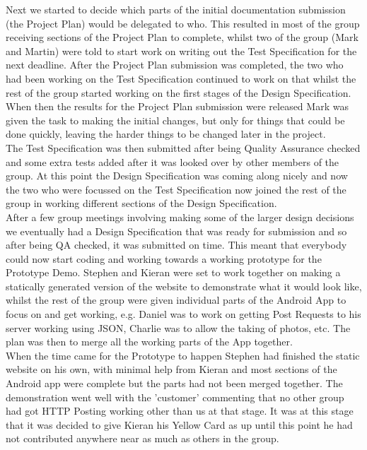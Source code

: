 \documentclass{article}
\begin{document}
		Next we started to decide which parts of the initial documentation submission (the Project Plan) would be delegated to who. This resulted in most of the group receiving sections of the Project Plan to complete, whilst two of the group (Mark and Martin) were told to start work on writing out the Test Specification for the next deadline. After the Project Plan submission was completed, the two who had been working on the Test Specification continued to work on that whilst the rest of the group started working on the first stages of the Design Specification. When then the results for the Project Plan submission were released Mark was given the task to making the initial changes, but only for things that could be done quickly, leaving the harder things to be changed later in the project. \\

		The Test Specification was then submitted after being Quality Assurance checked and some extra tests added after it was looked over by other members of the group. At this point the Design Specification was coming along nicely and now the two who were focussed on the Test Specification now joined the rest of the group in working different sections of the Design Specification. \\

		After a few group meetings involving making some of the larger design decisions we eventually had a Design Specification that was ready for submission and so after being QA checked, it was submitted on time. This meant that everybody could now start coding and working towards a working prototype for the Prototype Demo. Stephen and Kieran were set to work together on making a statically generated version of the website to demonstrate what it would look like, whilst the rest of the group were given individual parts of the Android App to focus on and get working, e.g. Daniel was to work on getting Post Requests to his server working using JSON, Charlie was to allow the taking of photos, etc. The plan was then to merge all the working parts of the App together. \\

		When the time came for the Prototype to happen Stephen had finished the static website on his own, with minimal help from Kieran and most sections of the Android app were complete but the parts had not been merged together. The demonstration went well with the 'customer' commenting that no other group had got HTTP Posting working other than us at that stage. It was at this stage that it was decided to give Kieran his Yellow Card as up until this point he had not contributed anywhere near as much as others in the group. \\
\end{document}
